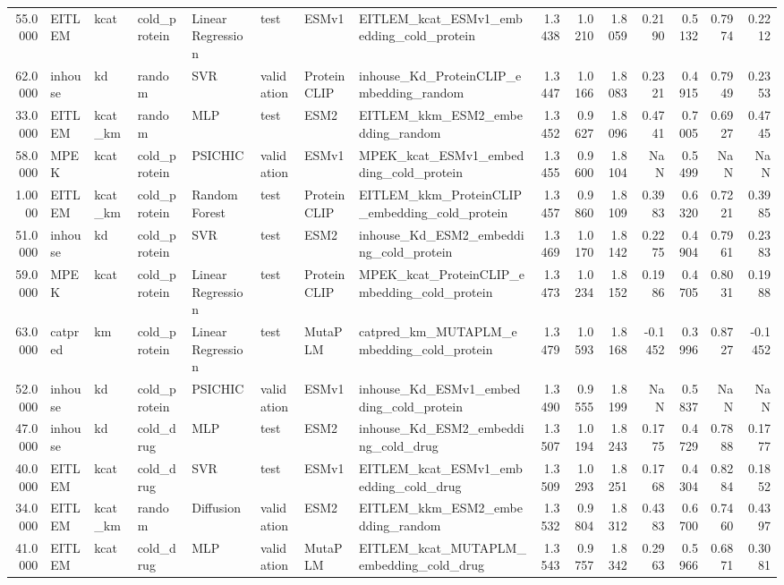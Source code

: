 \begin{tabular}{rlllllllrrrrrrr}
55.0000 & EITLEM & kcat & cold_protein & Linear Regression & test & ESMv1 & EITLEM_kcat_ESMv1_embedding_cold_protein & 1.3438 & 1.0210 & 1.8059 & 0.2190 & 0.5132 & 0.7974 & 0.2212 \\
62.0000 & inhouse & kd & random & SVR & validation & ProteinCLIP & inhouse_Kd_ProteinCLIP_embedding_random & 1.3447 & 1.0166 & 1.8083 & 0.2321 & 0.4915 & 0.7949 & 0.2353 \\
33.0000 & EITLEM & kcat_km & random & MLP & test & ESM2 & EITLEM_kkm_ESM2_embedding_random & 1.3452 & 0.9627 & 1.8096 & 0.4741 & 0.7005 & 0.6927 & 0.4745 \\
58.0000 & MPEK & kcat & cold_protein & PSICHIC & validation & ESMv1 & MPEK_kcat_ESMv1_embedding_cold_protein & 1.3455 & 0.9600 & 1.8104 & NaN & 0.5499 & NaN & NaN \\
1.0000 & EITLEM & kcat_km & cold_protein & Random Forest & test & ProteinCLIP & EITLEM_kkm_ProteinCLIP_embedding_cold_protein & 1.3457 & 0.9860 & 1.8109 & 0.3983 & 0.6320 & 0.7221 & 0.3985 \\
51.0000 & inhouse & kd & cold_protein & SVR & test & ESM2 & inhouse_Kd_ESM2_embedding_cold_protein & 1.3469 & 1.0170 & 1.8142 & 0.2275 & 0.4904 & 0.7961 & 0.2383 \\
59.0000 & MPEK & kcat & cold_protein & Linear Regression & test & ProteinCLIP & MPEK_kcat_ProteinCLIP_embedding_cold_protein & 1.3473 & 1.0234 & 1.8152 & 0.1986 & 0.4705 & 0.8031 & 0.1988 \\
63.0000 & catpred & km & cold_protein & Linear Regression & test & MutaPLM & catpred_km_MUTAPLM_embedding_cold_protein & 1.3479 & 1.0593 & 1.8168 & -0.1452 & 0.3996 & 0.8727 & -0.1452 \\
52.0000 & inhouse & kd & cold_protein & PSICHIC & validation & ESMv1 & inhouse_Kd_ESMv1_embedding_cold_protein & 1.3490 & 0.9555 & 1.8199 & NaN & 0.5837 & NaN & NaN \\
47.0000 & inhouse & kd & cold_drug & MLP & test & ESM2 & inhouse_Kd_ESM2_embedding_cold_drug & 1.3507 & 1.0194 & 1.8243 & 0.1775 & 0.4729 & 0.7888 & 0.1777 \\
40.0000 & EITLEM & kcat & cold_drug & SVR & test & ESMv1 & EITLEM_kcat_ESMv1_embedding_cold_drug & 1.3509 & 1.0293 & 1.8251 & 0.1768 & 0.4304 & 0.8284 & 0.1852 \\
34.0000 & EITLEM & kcat_km & random & Diffusion & validation & ESM2 & EITLEM_kkm_ESM2_embedding_random & 1.3532 & 0.9804 & 1.8312 & 0.4383 & 0.6700 & 0.7460 & 0.4397 \\
41.0000 & EITLEM & kcat & cold_drug & MLP & validation & MutaPLM & EITLEM_kcat_MUTAPLM_embedding_cold_drug & 1.3543 & 0.9757 & 1.8342 & 0.2963 & 0.5966 & 0.6871 & 0.3081 \\

\end{tabular}
